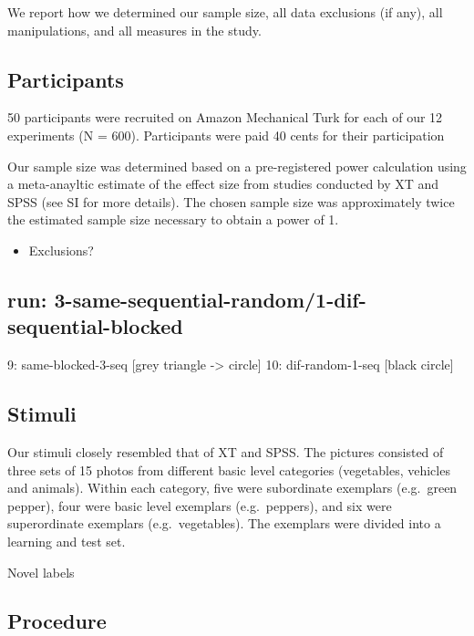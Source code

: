 \documentclass[english,floatsintext,man]{apa6}
\providecommand{\tightlist}{%
  \setlength{\itemsep}{0pt}\setlength{\parskip}{0pt}}
\theoremstyle{definition}
\theoremstyle{definition}
\theoremstyle{remark}
\begin{document}
We report how we determined our sample size, all data exclusions (if
any), all manipulations, and all measures in the study.

\subsection{Participants}\label{participants}

50 participants were recruited on Amazon Mechanical Turk for each of our
12 experiments (N = 600). Participants were paid 40 cents for their
participation

Our sample size was determined based on a pre-registered power
calculation using a meta-anayltic estimate of the effect size from
studies conducted by XT and SPSS (see SI for more details). The chosen
sample size was approximately twice the estimated sample size necessary
to obtain a power of 1.

\begin{itemize}
\tightlist
\item
  Exclusions?
\end{itemize}

\subsection{run:
3-same-sequential-random/1-dif-sequential-blocked}\label{run-3-same-sequential-random1-dif-sequential-blocked}

9: same-blocked-3-seq {[}grey triangle -\textgreater{} circle{]} 10:
dif-random-1-seq {[}black circle{]}

\subsection{Stimuli}\label{stimuli}

Our stimuli closely resembled that of XT and SPSS. The pictures
consisted of three sets of 15 photos from different basic level
categories (vegetables, vehicles and animals). Within each category,
five were subordinate exemplars (e.g.~green pepper), four were basic
level exemplars (e.g.~peppers), and six were superordinate exemplars
(e.g.~vegetables). The exemplars were divided into a learning and test
set.

Novel labels

\subsection{Procedure}\label{procedure}
\end{document}

